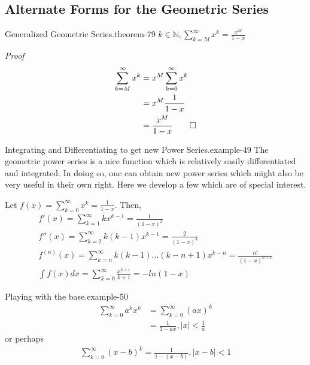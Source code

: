\documentclass[10pt,]{book}
\makeatletter
\renewcommand*{\proofname}{Proof}
\renewenvironment{proof}[1][\proofname]{\par
  \pushQED{\qed}%
  \normalfont \topsep6\p@\@plus6\p@\relax
  \trivlist
  \item\relax
    {\itshape
    #1\@addpunct{.}}\hspace\labelsep\ignorespaces
}{%
  \popQED\endtrivlist\@endpefalse
}
\numberwithin{equation}{section}
\newcommand{\lt}{<}
\makeatother
\begin{document}
\subsection[{Alternate Forms for the Geometric Series}]{Alternate Forms for the Geometric Series}\label{subsection-8}
\begin{theorem}{Generalized Geometric Series.}{}{theorem-79}%
\(k \in \mathbb{N}, \sum_{k=M}^{\infty} {x^k} = \frac{x^M}{1-x}\)\end{theorem}
\begin{proof}\hypertarget{proof-76}{}
%
\begin{align*}
\sum_{k=M}^{\infty} {x^k} & = x^M \sum_{k=0}^{\infty} {x^k}\\
& = x^M \frac{1}{1-x}\\
& = \frac{x^M}{1-x}\qedhere
\end{align*}
\end{proof}
\begin{example}{Integrating and Differentiating to get new Power Series.}{example-49}%
\hypertarget{p-1213}{}%
The geometric power series is a nice function which is relatively easily differentiated and integrated. In doing so, one can obtain new power series which might also be very useful in their own right.  Here we develop a few which are of special interest.%
\par
\hypertarget{p-1214}{}%
Let \(f(x) = \sum_{k=0}^\infty x^k = \frac{1}{1-x}\).  Then,%
%
\begin{gather*}
f'(x) = \sum_{k=1}^{\infty} {kx^{k-1}} = \frac{1}{(1-x)^2}\\
f''(x) = \sum_{k=2}^{\infty} {k(k-1)x^{k-1}} = \frac{2}{(1-x)^3}\\
f^{(n)}(x) = \sum_{k=n}^{\infty} {k(k-1)...(k-n+1)x^{k-n}} = \frac{n!}{(1-x)^{n+1}}\\
\int f(x) dx = \sum_{k=0}^{\infty} {\frac{x^{k+1}}{k+1}} = -ln(1-x)
\end{gather*}
\end{example}
\begin{example}{Playing with the base.}{example-50}%
%
\begin{align*}
\sum_{k=0}^{\infty} {a^k x^k} & = \sum_{k=0}^{\infty} {(ax)^k}\\
& = \frac{1}{1-ax}, |x| \lt \frac{1}{a}
\end{align*}
\hypertarget{p-1215}{}%
or perhaps%
%
\begin{gather*}
\sum_{k=0}^{\infty} {(x-b)^k} = \frac{1}{1-(x-b)}, |x-b| \lt 1
\end{gather*}
\end{example}
\end{document}
